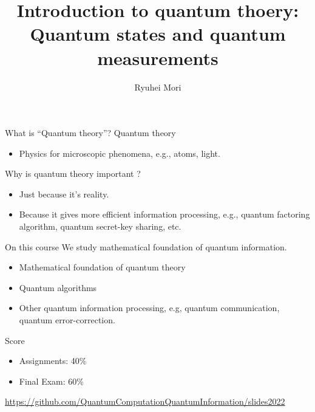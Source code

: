 \documentclass{beamer}
\title{Introduction to quantum thoery: Quantum states and quantum measurements}
\author{Ryuhei Mori}
\institute{Tokyo Institute of Technology}
\date{}
\newcommand\emm[1]{\textcolor{redorange}{{#1}}}
\theoremstyle{definition}
\begin{document}
\begin{frame}[plain]
\maketitle
\end{frame}


\begin{frame}{What is ``Quantum theory''?}
Quantum theory

\vspace{1em}
\begin{itemize}
\item Physics for microscopic phenomena, e.g., atoms, light.
\end{itemize}

\vspace{2em}
Why is quantum theory important ?

\vspace{1em}
\begin{itemize}
\setlength{\itemsep}{2em}
\item Just because it's \emm{reality}.
\item Because it gives more \emm{efficient} information processing, e.g., quantum factoring algorithm, quantum secret-key sharing, etc.
\end{itemize}
\end{frame}

\begin{frame}{On this course}
We study \emm{mathematical foundation} of quantum information.
\begin{itemize}
\setlength{\itemsep}{1em}
\item Mathematical foundation of quantum theory
\item Quantum algorithms
\item Other quantum information processing, e.g, quantum communication, quantum error-correction.
\end{itemize}

\vspace{2em}
Score
\begin{itemize}
\item Assignments: 40\%
\item Final Exam: 60\%
\end{itemize}

\vfill
\small
\url{https://github.com/QuantumComputationQuantumInformation/slides2022}
\end{frame}
\end{document}
